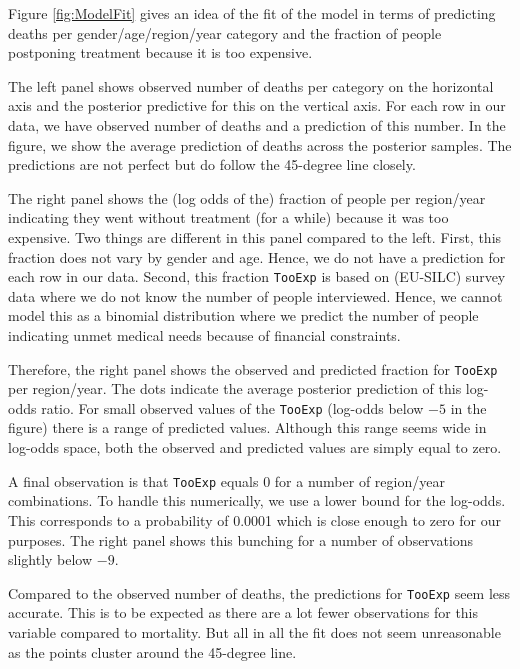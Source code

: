 \documentclass[a4paper,12pt]{article}
\begin{document}
Figure \ref{fig:ModelFit} gives an idea of the fit of the model in terms of predicting deaths per gender/age/region/year category and the fraction of people postponing treatment because it is too expensive.

The left panel shows observed number of deaths per category on the horizontal axis and the posterior predictive for this on the vertical axis. For each row in our data, we have observed number of deaths and a prediction of this number. In the figure, we show the average prediction of deaths across the posterior samples. The predictions are not perfect but do follow the 45-degree line closely.

The right panel shows the (log odds of the) fraction of people per region/year indicating they went without treatment (for a while) because it was too expensive. Two things are different in this panel compared to the left. First, this fraction does not vary by gender and age. Hence, we do not have a prediction for each row in our data. Second, this fraction \texttt{TooExp} is based on (EU-SILC) survey data where we do not know the number of people interviewed. Hence, we cannot model this as a binomial distribution where we predict the number of people indicating unmet medical needs because of financial constraints.

Therefore, the right panel shows the observed and predicted fraction for \texttt{TooExp} per region/year. The dots indicate the average posterior prediction of this log-odds ratio. For small observed values of the \texttt{TooExp} (log-odds below \(-5\) in the figure) there is a range of predicted values. Although this range seems wide in log-odds space, both the observed and predicted values are simply equal to zero.

A final observation is that \texttt{TooExp} equals 0 for a number of region/year combinations. To handle this numerically, we use a lower bound for the log-odds. This corresponds to a probability of 0.0001 which is close enough to zero for our purposes. The right panel shows this bunching for a number of observations slightly below \(-9\).

Compared to the observed number of deaths, the predictions for \texttt{TooExp} seem less accurate. This is to be expected as there are a lot fewer observations for this variable compared to mortality. But all in all the fit does not seem unreasonable as the points cluster around the 45-degree line.
\end{document}
